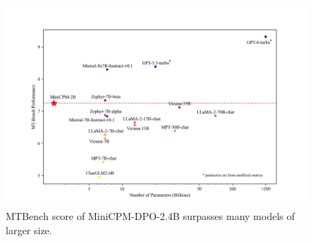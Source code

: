 \begin{figure}
    \centering
    \includegraphics[width=0.7\linewidth]{Fig/mtbench_graph.jpg}
    \caption{MTBench score of MiniCPM-DPO-2.4B surpasses many models of larger size. }
    \label{fig:mtbenchscore}
    \vspace{-5mm}
\end{figure}


